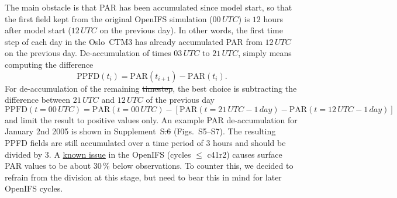 \documentclass[gmd, manuscript]{copernicus}
\providecommand{\DIFadd}[1]{{\protect\color{blue}\uwave{#1}}} %
\providecommand{\DIFdel}[1]{{\protect\color{red}\sout{#1}}}                      %
\providecommand{\DIFaddbegin}{} %
\providecommand{\DIFaddend}{} %
\providecommand{\DIFdelbegin}{} %
\providecommand{\DIFdelend}{} %
\begin{document}
\DIFaddend The main obstacle is that PAR has been accumulated since model start, so that the first field kept from the original OpenIFS simulation ($00\,\unit{UTC}$) is $12$ hours after model start ($12\,\unit{UTC}$ on the previous day). In other words, the first time step of each day in the Oslo~CTM3 has already accumulated PAR from $12\,\unit{UTC}$ on the previous day.
De-accumulation of times $03\,\unit{UTC}$ to $21\,\unit{UTC}$, simply means computing the difference
\begin{equation}
  \text{PPFD}(t_i) = \text{PAR}(t_{i+1})-\text{PAR}(t_i).
\end{equation}
For de-accumulation of the remaining \DIFdelbegin \DIFdel{timestep}\DIFdelend \DIFaddbegin \DIFadd{time step}\DIFaddend , the best choice is subtracting the difference between $21\,\unit{UTC}$ and $12\,\unit{UTC}$ of the previous day
%
\begin{equation}
  \text{PPFD}(t=00\,\unit{UTC}) = \text{PAR}(t=00\,\unit{UTC}) - \left[\text{PAR}(t=21\,\unit{UTC}-1\,\unit{day})-\text{PAR}(t=12\,\unit{UTC}-1\,\unit{day})\right]
\end{equation}
%
and limit the result to positive values only. An example PAR de-accumulation for January 2nd 2005 is shown in Supplement~S\DIFdelbegin \DIFdel{.6 }\DIFdelend \DIFaddbegin \DIFadd{.5 }\DIFaddend (Figs.~S5--S7).
The resulting PPFD fields are still accumulated over a time period of $3$ hours and should be divided by $3$. A \href{https://confluence.ecmwf.int/display/CKB/ERA-Interim\%3A+surface+photosynthetically+active+radiation+\%28surface+PAR\%29+values+are+too+low}{known issue} in the OpenIFS (cycles $\le$ c41r2) causes surface PAR values to be about $30\,\unit{\%}$ below observations. To counter this, we decided to refrain from the division at this stage, but need to bear this in mind for later OpenIFS cycles.
\DIFaddbegin 

\DIFaddend %
\end{document}
